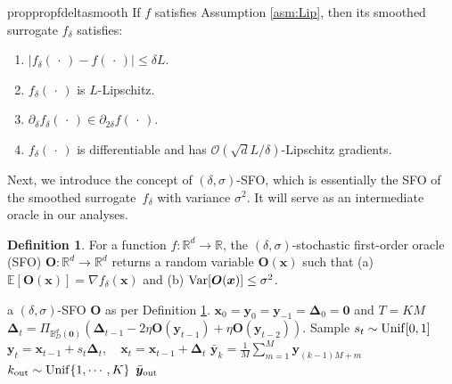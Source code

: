 \documentclass{article}
\def\vzero{{\bm{0}}}
\def\vg{{\bm{g}}}
\def\vs{{\bm{s}}}
\def\vv{{\bm{v}}}
\def\vx{{\bm{x}}}
\def\vy{{\bm{y}}}
\def\mO{{\bm{O}}}
\def\gO{{\mathcal{O}}}
\def\sB{{\mathbb{B}}}
\def\sR{{\mathbb{R}}}
\newcommand{\E}{\mathbb{E}}
\def\vDelta{{\bm{\Delta}}}
\theoremstyle{definition}
\newtheorem{dfn}{Definition}[section]
\theoremstyle{remark}
\begin{document}
	\begin{restatable}{prop}{propfdeltasmooth} \label{prop:f-delta-smooth}
		If $f$ satisfies Assumption \ref{asm:Lip}, then its smoothed surrogate $f_{\delta}$ satisfies:
		\begin{enumerate}
			\item[(a)] $\vert f_{\delta}(\,\cdot\,) - f(\,\cdot\,) \vert \le \delta L$.
			\item[(b)] $f_{\delta}(\,\cdot\,)$ is $L$-Lipschitz.
			\item[(c)] $\partial_{\delta} f_{\delta}(\,\cdot\,) \in \partial_{2 \delta} f(\,\cdot\,)$. 
			\item[(d)] $f_{\delta}(\,\cdot\,)$ is differentiable and has $\gO(\sqrt{d}L / \delta)$-Lipschitz gradients.
		\end{enumerate}
	\end{restatable}
	Next, we introduce the concept of $(\delta,\sigma)$-SFO, which is essentially the SFO of the smoothed surrogate~$f_\delta$ with variance $\sigma^2$. It will serve as an intermediate oracle in our analyses.
	
	\begin{dfn} \label{dfn:delta-SFO}
		For a function $f: \sR^d \rightarrow \sR$, the $(\delta,\sigma)$-stochastic first-order oracle (SFO) $\mO:\sR^d \rightarrow \sR^d$ returns a random variable $\mO(\vx)$ such that (a) $ \E [ \mO(\vx)] = \nabla f_{\delta}(\vx)$ and (b) ${\rm Var}[\mO(\vx)] \le \sigma^2$.
	\end{dfn}    
	
	
	
	\begin{algorithm}[t] 
		\caption{NOG$(K, M, D)$}
		\label{alg:fast-O2NC}
		\begin{algorithmic}[1]
			\Require a $(\delta,\sigma)$-SFO $\mO$ as per Definition \ref{dfn:delta-SFO}. 
			\State  $\vx_0 = \vy_0 = \vy_{-1} =  \vDelta_0 =  \vzero $ and $T = KM$ 
			\State $\vDelta_{t} = \Pi_{\sB^d_D(\vzero)} (\vDelta_{t-1} - 2\eta\mO(\vy_{t-1}) + \eta \mO(\vy_{t-2}))$.
			\State Sample $s_t \sim {\rm Unif}[0,1]$
			\State $ \vy_{t} = \vx_{t-1} +  s_t \vDelta_{t}$, ~ $\vx_{t} = \vx_{t-1} + \vDelta_{t}$  
			\EndFor 
			\State $\bar \vy_k = \frac{1}{M} \sum_{m=1}^{M} \vy_{(k-1) M+m} $ 
			\EndFor 
			\State $k_{\rm out} \sim {\rm Unif}\{ 1,\cdots,K\}$ 
			\Return $\bar \vy_{\rm out}$ 
		\end{algorithmic}
	\end{algorithm}
	
\end{document}
